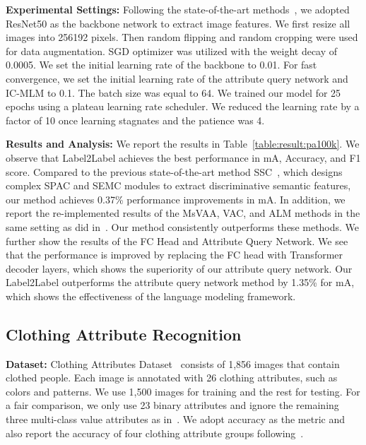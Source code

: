 \documentclass[runningheads]{llncs}
\begin{document}
\textbf{Experimental Settings:} Following the  state-of-the-art methods~\cite{jia2021spatial,guo2019visual}, we adopted ResNet50 as the backbone network to extract image features. We first resize all images into 256192 pixels. Then random flipping and random cropping were used for data augmentation. SGD optimizer was utilized with the weight decay of 0.0005. We set the initial learning rate of the backbone to 0.01. For fast convergence, we set the initial learning rate of the attribute query network and IC-MLM to 0.1. The batch size was equal to 64. We trained our model for 25 epochs using a plateau learning rate scheduler. We reduced the learning rate by a factor of 10 once learning stagnates and the patience was 4. 


\textbf{Results and Analysis:} We report the results in  Table~\ref{table:result:pa100k}. We observe that Label2Label achieves the best performance in mA, Accuracy, and F1 score. Compared to the previous state-of-the-art method SSC~\cite{jia2021spatial}, which designs complex SPAC and SEMC modules to extract discriminative semantic features, our method achieves 0.37\% performance improvements in mA. In addition, we report the re-implemented results of the MsVAA, VAC, and ALM methods in the same setting as did in~\cite{jia2021spatial}. Our method consistently outperforms these methods.
We further show the results of the FC Head and Attribute Query Network. 
We see that the performance is improved by replacing the FC head with Transformer decoder layers, 
which shows the superiority of our attribute query network.
Our Label2Label outperforms the attribute query network method by 1.35\% for mA, which shows the effectiveness of the language modeling framework.



\subsection{Clothing Attribute Recognition}
\textbf{Dataset:} Clothing Attributes Dataset~\cite{chen2012describing} consists of 1,856 images that contain clothed people. Each image is annotated with 26 clothing attributes, such as colors and patterns. We use 1,500 images for training and the rest for testing. For a fair comparison, we only use 23 binary attributes and ignore the remaining three multi-class value attributes as in~\cite{abdulnabi2015multi,meng2018efficient}. We adopt 
accuracy as the metric and also report the accuracy of four clothing attribute groups following~\cite{abdulnabi2015multi,meng2018efficient}.
\end{document}
